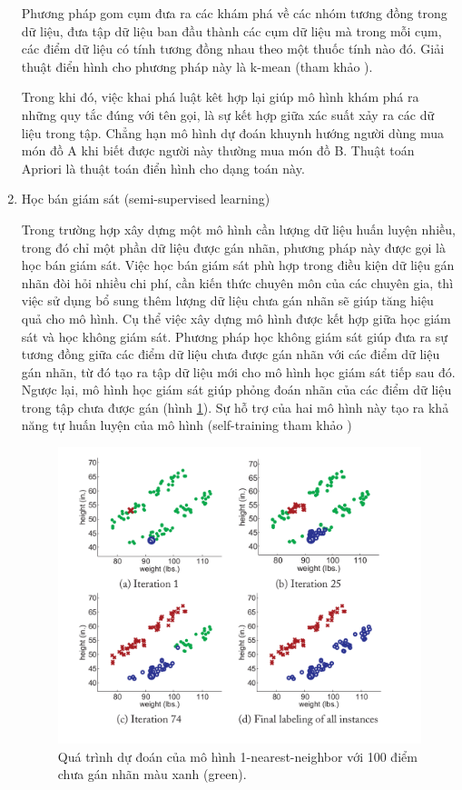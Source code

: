 \begin{enumerate}
    Phương pháp gom cụm đưa ra các khám phá về các nhóm tương đồng trong dữ liệu, đưa tập dữ liệu ban đầu thành các cụm dữ liệu mà trong mỗi cụm, các điểm dữ liệu có tính tương đồng nhau theo một thuốc tính nào đó. Giải thuật điển hình cho phương pháp này là k-mean (tham khảo \cite{tiep2018machine}). 
    
    Trong khi đó, việc khai phá luật kêt hợp lại giúp mô hình khám phá ra những quy tắc đúng với tên gọi, là sự kết hợp giữa xác suất xảy ra các dữ liệu trong tập. Chẳng hạn mô hình dự đoán khuynh hướng người dùng mua món đồ A khi biết được người này thường mua món đồ B. Thuật toán Apriori là thuật toán điển hình cho dạng toán này.

    \item Học bán giám sát (semi-supervised learning)

    Trong trường hợp xây dựng một mô hình cần lượng dữ liệu huấn luyện nhiều, trong đó chỉ một phần dữ liệu được gán nhãn, phương pháp này được gọi là học bán giám sát. Việc học bán giám sát phù hợp trong điều kiện dữ liệu gán nhãn đòi hỏi nhiều chi phí, cần kiến thức chuyên môn của các chuyên gia, thì việc sử dụng bổ sung thêm lượng dữ liệu chưa gán nhãn sẽ giúp tăng hiệu quả cho mô hình. Cụ thể việc xây dựng mô hình được kết hợp giữa học giám sát và học không giám sát. Phương pháp học không giám sát giúp đưa ra sự tương đồng giữa các điểm dữ liệu chưa được gán nhãn với các điểm dữ liệu gán nhãn, từ đó tạo ra tập dữ liệu mới cho mô hình học giám sát tiếp sau đó. Ngược lại, mô hình học giám sát giúp phỏng đoán nhãn của các điểm dữ liệu trong tập chưa được gán (hình \ref{fig:semi}). Sự hỗ trợ của hai mô hình này tạo ra khả năng tự huấn luyện của mô hình (self-training tham khảo \cite{zhu2009introduction})

    \begin{figure}[t]
        \begin{center}
            \includegraphics[width=\linewidth]{asset/image/semisupervised.png}
            \caption{Quá trình dự đoán của mô hình 1-nearest-neighbor với 100 điểm chưa gán nhãn màu xanh (green). }
            \label{fig:semi}
        \end{center}
    \end{figure}


\end{enumerate}

